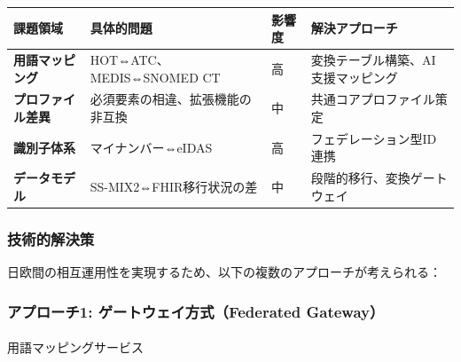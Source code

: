 \documentclass[
  a4paper,
  a4paper,
  11pt]{ltjsbook}
\makeatletter
\let\oldparagraph\paragraph
\renewcommand{\paragraph}{
    \@ifstar
      \xxxParagraphStar
      \xxxParagraphNoStar
  }
\newcommand{\xxxParagraphStar}[1]{\oldparagraph*{#1}\mbox{}}
\newcommand{\xxxParagraphNoStar}[1]{\oldparagraph{#1}\mbox{}}
\makeatother
\begin{document}
\begin{longtable}[]{@{}
  >{\raggedright\arraybackslash}p{}
  >{\raggedright\arraybackslash}p{}
  >{\raggedright\arraybackslash}p{}
  >{\raggedright\arraybackslash}p{}@{}}
\toprule\noalign{}
\begin{minipage}[b]{\linewidth}\raggedright
課題領域
\end{minipage} & \begin{minipage}[b]{\linewidth}\raggedright
具体的問題
\end{minipage} & \begin{minipage}[b]{\linewidth}\raggedright
影響度
\end{minipage} & \begin{minipage}[b]{\linewidth}\raggedright
解決アプローチ
\end{minipage} \\
\midrule\noalign{}
\endhead
\bottomrule\noalign{}
\endlastfoot
\textbf{用語マッピング} & HOT⇔ATC、MEDIS⇔SNOMED CT & 高 &
変換テーブル構築、AI支援マッピング \\
\textbf{プロファイル差異} & 必須要素の相違、拡張機能の非互換 & 中 &
共通コアプロファイル策定 \\
\textbf{識別子体系} & マイナンバー⇔eIDAS & 高 &
フェデレーション型ID連携 \\
\textbf{データモデル} & SS-MIX2⇔FHIR移行状況の差 & 中 &
段階的移行、変換ゲートウェイ \\
\end{longtable}

\subsubsection{技術的解決策}\label{ux6280ux8853ux7684ux89e3ux6c7aux7b56}

日欧間の相互運用性を実現するため、以下の複数のアプローチが考えられる：

\subsubsection{アプローチ1: ゲートウェイ方式（Federated
Gateway）}\label{ux30a2ux30d7ux30edux30fcux30c11-ux30b2ux30fcux30c8ux30a6ux30a7ux30a4ux65b9ux5f0ffederated-gateway}

\paragraph{用語マッピングサービス}\label{ux7528ux8a9eux30deux30c3ux30d4ux30f3ux30b0ux30b5ux30fcux30d3ux30b9}
\end{document}
